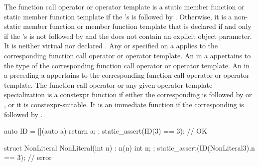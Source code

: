 \pnum
The function call operator or operator template is
a static member function or static member function template
if the 's
 is followed by .
Otherwise, it is
a non-static member function or member function template
that is declared
 if and only if the
's  is not
followed by  and
the  does not contain
an explicit object parameter.
It is neither virtual nor declared .
Any  or 
specified on a 
applies to the corresponding function call operator or operator template.
An  in a  appertains
to the type of the corresponding function call operator or operator template.
An  in a 
preceding a 
appertains to the corresponding function call operator or operator template.
The function call operator or any given operator template specialization
is a constexpr function if either
the corresponding 
is followed by  or , or
it is constexpr-suitable.
It is an immediate function
if the corresponding 
 is followed by .
\begin{example}
\begin{codeblock}
auto ID = [](auto a) { return a; };
static_assert(ID(3) == 3);                      // OK

struct NonLiteral {
  NonLiteral(int n) : n(n) { }
  int n;
};
static_assert(ID(NonLiteral{3}).n == 3);        // error
\end{codeblock}
\end{example}

